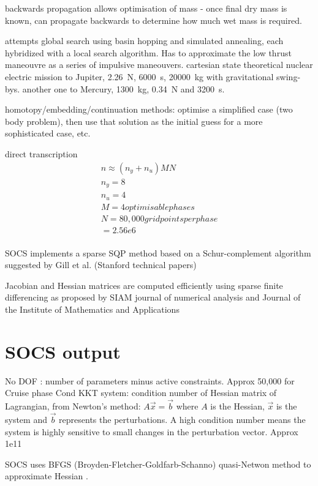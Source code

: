 backwards propagation allows optimisation of mass - once final dry mass is known, can propagate backwards to determine how much wet mass is required.


\cite{Yam2011} attempts global search using basin hopping and simulated annealing, each hybridized with a local search algorithm. Has to approximate the low thrust maneouvre as a series of impulsive maneouvers.
cartesian state
theoretical nuclear electric mission to Jupiter, 2.26~N, 6000~s, 20000~kg with gravitational swing-bys.
another one to Mercury, 1300~kg, 0.34~N and 3200~s.


homotopy/embedding/continuation methods: optimise a simplified case (two body problem), then use that solution as the initial guess for a more sophisticated case, etc.


direct transcription
\begin{subequations}
\begin{gather}
n \approx (n_y + n_u)MN \\
n_y = 8 \\
n_u = 4 \\
M = 4 optimisable phases \\
N = 80,000 grid points per phase \\
=2.56e6 \\
\end{gather}
\end{subequations}
\cite{Betts1998}

SOCS implements a sparse SQP method based on a Schur-complement algorithm suggested by Gill et al. (Stanford technical papers)

Jacobian and Hessian matrices are computed efficiently using sparse finite differencing as proposed by \cite{Coleman1983} SIAM journal of numerical analysis and \cite{Curtis1974} Journal of the Institute of Mathematics and Applications

\section{SOCS output}
No DOF : number of parameters minus active constraints. Approx 50,000 for Cruise phase
Cond KKT system: condition number of Hessian matrix of Lagrangian, from Newton's method: $A\vec{x}=\vec{b}$ where $A$ is the Hessian, $\vec{x}$ is the system and $\vec{b}$ represents the perturbations. A high condition number means the system is highly sensitive to small changes in the perturbation vector. Approx 1e11

SOCS uses BFGS (Broyden-Fletcher-Goldfarb-Schanno) quasi-Netwon method to approximate Hessian .

